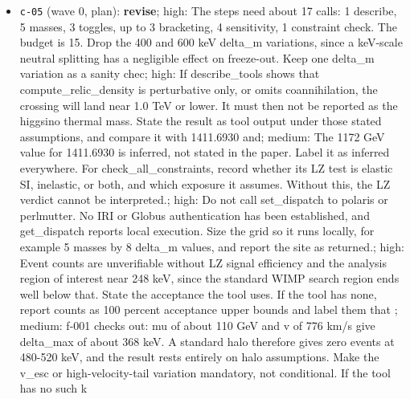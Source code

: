 \documentclass[11pt,a4paper]{article}
\begin{document}
\begin{itemize}
  \item \texttt{c-05} (wave 0, plan): \textbf{revise}; high: The steps need about 17 calls: 1 describe, 5 masses, 3 toggles, up to 3 bracketing, 4 sensitivity, 1 constraint check. The budget is 15. Drop the 400 and 600 keV delta\_m variations, since a keV-scale neutral splitting has a negligible effect on freeze-out. Keep one delta\_m variation as a sanity chec; high: If describe\_tools shows that compute\_relic\_density is perturbative only, or omits coannihilation, the crossing will land near 1.0 TeV or lower. It must then not be reported as the higgsino thermal mass. State the result as tool output under those stated assumptions, and compare it with 1411.6930 and; medium: The 1172 GeV value for 1411.6930 is inferred, not stated in the paper. Label it as inferred everywhere. For check\_all\_constraints, record whether its LZ test is elastic SI, inelastic, or both, and which exposure it assumes. Without this, the LZ verdict cannot be interpreted.; high: Do not call set\_dispatch to polaris or perlmutter. No IRI or Globus authentication has been established, and get\_dispatch reports local execution. Size the grid so it runs locally, for example 5 masses by 8 delta\_m values, and report the site as returned.; high: Event counts are unverifiable without LZ signal efficiency and the analysis region of interest near 248 keV, since the standard WIMP search region ends well below that. State the acceptance the tool uses. If the tool has none, report counts as 100 percent acceptance upper bounds and label them that ; medium: f-001 checks out: mu of about 110 GeV and v of 776 km/s give delta\_max of about 368 keV. A standard halo therefore gives zero events at 480-520 keV, and the result rests entirely on halo assumptions. Make the v\_esc or high-velocity-tail variation mandatory, not conditional. If the tool has no such k

\end{itemize}
\end{document}
